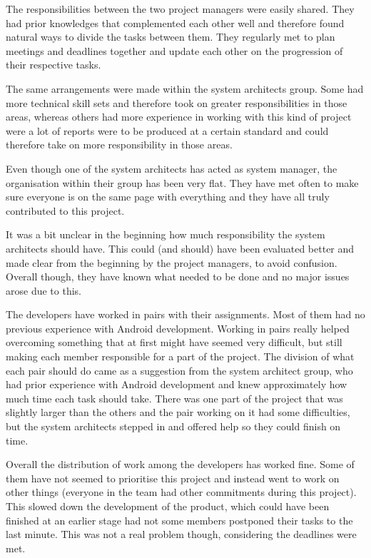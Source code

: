 \documentclass[a4paper]{article}
\begin{document}
The responsibilities between the two project managers were easily shared. They had prior knowledges that complemented each other well and therefore found natural ways to divide the tasks between them. They regularly met to plan meetings and deadlines together and update each other on the progression of their respective tasks. 

The same arrangements were made within the system architects group. Some had more technical skill sets and therefore took on greater responsibilities in those areas, whereas others had more experience in working with this kind of project were a lot of reports were to be produced at a certain standard and could therefore take on more responsibility in those areas. 

Even though one of the system architects has acted as system manager, the organisation within their group has been very flat. They have met often to make sure everyone is on the same page with everything and they have all truly contributed to this project.

It was a bit unclear in the beginning how much responsibility the system architects should have. This could (and should) have been evaluated better and made clear from the beginning by the project managers, to avoid confusion. Overall though, they have known what needed to be done and no major issues arose due to this.

The developers have worked in pairs with their assignments. Most of them had no previous experience with Android development. Working in pairs really helped overcoming something that at first might have seemed very difficult, but still making each member responsible for a part of the project. The division of what each pair should do came as a suggestion from the system architect group, who had prior experience with Android development and knew approximately how much time each task should take. There was one part of the project that was slightly larger than the others and the pair working on it had some difficulties, but the system architects stepped in and offered help so they could finish on time.

Overall the distribution of work among the developers has worked fine. Some of them have not seemed to prioritise this project and instead went to work on other things (everyone in the team had other commitments during this project). This slowed down the development of the product, which could have been finished at an earlier stage had not some members postponed their tasks to the last minute. This was not a real problem though, considering the deadlines were met. 
\end{document}
